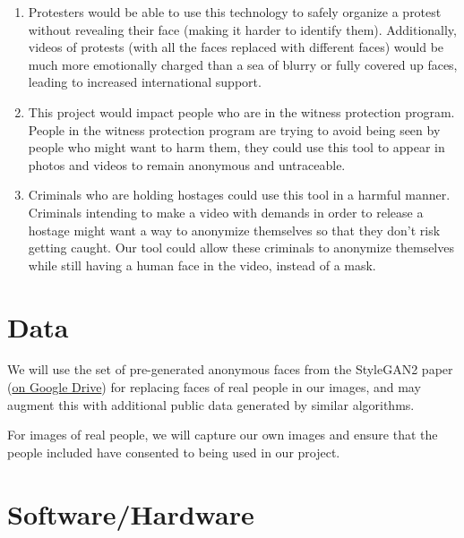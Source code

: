 
\begin{enumerate}
    \item Protesters would be able to use this technology to safely organize a protest without revealing their face (making it harder to identify them). Additionally, videos of protests (with all the faces replaced with different faces) would be much more emotionally charged than a sea of blurry or fully covered up faces, leading to increased international support.

    \item This project would impact people who are in the witness protection program. People in the witness protection program are trying to avoid being seen by people who might want to harm them, they could use this tool to appear in photos and videos to remain anonymous and untraceable.

    \item Criminals who are holding hostages could use this tool in a harmful manner. Criminals intending to make a video with demands in order to release a hostage might want a way to anonymize themselves so that they don't risk getting caught. Our tool could allow these criminals to anonymize themselves while still having a human face in the video, instead of a mask.

\end{enumerate}

\section*{Data}


We will use the set of pre-generated anonymous faces from the StyleGAN2 paper (\href{https://drive.google.com/drive/folders/1-0YhtXe_oE2ei0R471X33a_NJyY5dVge}{on Google Drive}) for replacing faces of real people in our images, and may augment this with additional public data generated by similar algorithms.

For images of real people, we will capture our own images and ensure that the people included have consented to being used in our project.

\section*{Software/Hardware}

